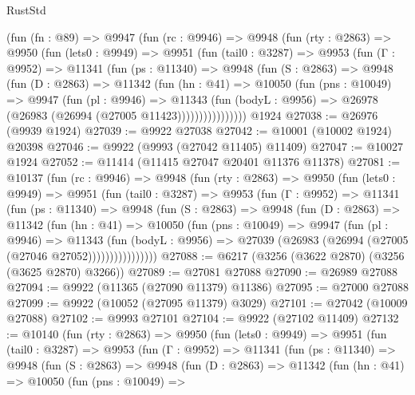 \begin{lexlean}{RustStd}
\begin{coremodule}
    (fun (fn : @89) =>
    @9947
      (fun (rc : @9946) =>
      @9948
        (fun (rty : @2863) =>
        @9950
          (fun (lets0 : @9949) =>
          @9951
            (fun (tail0 : @3287) =>
            @9953
              (fun (Γ : @9952) =>
              @11341
                (fun (ps : @11340) =>
                @9948
                  (fun (S : @2863) =>
                  @9948
                    (fun (D : @2863) =>
                    @11342
                      (fun (hn : @41) =>
                      @10050
                        (fun (pns : @10049) =>
                        @9947
                          (fun (pl : @9946) =>
                          @11343
                            (fun (bodyL : @9956) =>
                            @26978 (@26983 (@26994 (@27005 @11423))))))))))))))))
    @1924
@27038 := @26976 (@9939 @1924)
@27039 := @9922 @27038
@27042 := @10001 (@10002 @1924) @20398
@27046 := @9922 (@9993 (@27042 @11405) @11409)
@27047 := @10027 @1924
@27052 := @11414 (@11415 @27047 @20401 @11376 @11378)
@27081 := @10137
    (fun (rc : @9946) =>
    @9948
      (fun (rty : @2863) =>
      @9950
        (fun (lets0 : @9949) =>
        @9951
          (fun (tail0 : @3287) =>
          @9953
            (fun (Γ : @9952) =>
            @11341
              (fun (ps : @11340) =>
              @9948
                (fun (S : @2863) =>
                @9948
                  (fun (D : @2863) =>
                  @11342
                    (fun (hn : @41) =>
                    @10050
                      (fun (pns : @10049) =>
                      @9947
                        (fun (pl : @9946) =>
                        @11343
                          (fun (bodyL : @9956) =>
                          @27039 (@26983 (@26994 (@27005 (@27046 @27052))))))))))))))))
@27088 := @6217 (@3256 (@3622 @2870) (@3256 (@3625 @2870) @3266))
@27089 := @27081 @27088
@27090 := @26989 @27088
@27094 := @9922 (@11365 (@27090 @11379) @11386)
@27095 := @27000 @27088
@27099 := @9922 (@10052 (@27095 @11379) @3029)
@27101 := @27042 (@10009 @27088)
@27102 := @9993 @27101
@27104 := @9922 (@27102 @11409)
@27132 := @10140
    (fun (rty : @2863) =>
    @9950
      (fun (lets0 : @9949) =>
      @9951
        (fun (tail0 : @3287) =>
        @9953
          (fun (Γ : @9952) =>
          @11341
            (fun (ps : @11340) =>
            @9948
              (fun (S : @2863) =>
              @9948
                (fun (D : @2863) =>
                @11342
                  (fun (hn : @41) =>
                  @10050
                    (fun (pns : @10049) =>

\end{coremodule}
\end{lexlean}
